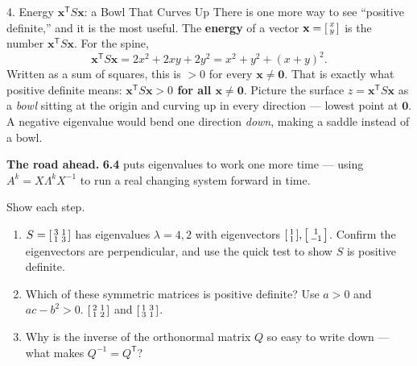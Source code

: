 \documentclass[10pt]{article}
\newcommand{\xx}{\mathbf{x}}
\newcommand{\zero}{\mathbf{0}}
\newcommand{\T}{\mathsf{T}}
\begin{document}
\begin{notesbox}{4. Energy $\xx^{\T}S\xx$: a Bowl That Curves Up}
There is one more way to see ``positive definite,'' and it is the most useful. The \textbf{energy} of a
vector $\xx=\begin{bsmallmatrix}x\\y\end{bsmallmatrix}$ is the number $\xx^{\T}S\xx$. For the spine,
\[
  \xx^{\T}S\xx = 2x^2+2xy+2y^2 = x^2+y^2+(x+y)^2.
\]
Written as a sum of squares, this is $>0$ for every $\xx\ne\zero$. That is exactly what positive definite
means: \textbf{$\xx^{\T}S\xx>0$ for all $\xx\ne\zero$}. Picture the surface $z=\xx^{\T}S\xx$ as a
\emph{bowl} sitting at the origin and curving up in every direction --- lowest point at $\zero$. A negative
eigenvalue would bend one direction \emph{down}, making a saddle instead of a bowl.

\vspace{3pt}
\textbf{The road ahead.} \textbf{6.4} puts eigenvalues to work one more time --- using
$A^k=X\Lambda^k X^{-1}$ to run a real changing system forward in time.
\end{notesbox}

\begin{practicebox}
Show each step.
\begin{enumerate}[leftmargin=1.6em, itemsep=6pt]
  \item $S=\begin{bsmallmatrix}3&1\\1&3\end{bsmallmatrix}$ has eigenvalues $\lambda=4,2$ with eigenvectors $\begin{bsmallmatrix}1\\1\end{bsmallmatrix},\begin{bsmallmatrix}1\\-1\end{bsmallmatrix}$. Confirm the eigenvectors are perpendicular, and use the quick test to show $S$ is positive definite. 
  \item Which of these symmetric matrices is positive definite? Use $a>0$ and $ac-b^2>0$. \quad $\begin{bsmallmatrix}2&1\\1&2\end{bsmallmatrix}$ \quad and \quad $\begin{bsmallmatrix}1&3\\3&1\end{bsmallmatrix}$. \writeline
  \item Why is the inverse of the orthonormal matrix $Q$ so easy to write down --- what makes $Q^{-1}=Q^{\T}$? \writeline
\end{enumerate}
\end{practicebox}
\end{document}
